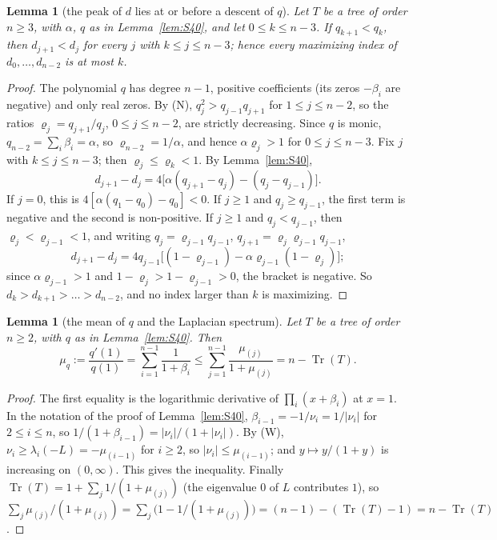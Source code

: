 \documentclass[11pt]{amsart}
\newtheorem{lemma}[theorem]{Lemma}
\theoremstyle{definition}
\theoremstyle{remark}
\newcommand{\Tr}{\operatorname{Tr}}
\begin{document}
\begin{lemma}[the peak of $d$ lies at or before a descent of $q$]\label{lem:S41}
Let $T$ be a tree of order $n\ge3$, with $\alpha$, $q$ as in
Lemma~\ref{lem:S40}, and let $0\le k\le n-3$. If $q_{k+1}<q_k$, then
$d_{j+1}<d_j$ for every $j$ with $k\le j\le n-3$; hence every maximizing
index of $d_0,\dots,d_{n-2}$ is at most $k$.
\end{lemma}

\begin{proof}
The polynomial $q$ has degree $n-1$, positive coefficients (its zeros
$-\beta_i$ are negative) and only real zeros. By (N),
$q_j^2>q_{j-1}q_{j+1}$ for $1\le j\le n-2$, so the ratios
$\varrho_j=q_{j+1}/q_j$, $0\le j\le n-2$, are strictly decreasing. Since $q$
is monic, $q_{n-2}=\sum_i\beta_i=\alpha$, so $\varrho_{n-2}=1/\alpha$, and
hence $\alpha\varrho_j>1$ for $0\le j\le n-3$. Fix $j$ with $k\le j\le n-3$;
then $\varrho_j\le\varrho_k<1$. By Lemma~\ref{lem:S40},
\[
d_{j+1}-d_j=4\bigl[\alpha(q_{j+1}-q_j)-(q_j-q_{j-1})\bigr].
\]
If $j=0$, this is $4[\alpha(q_1-q_0)-q_0]<0$. If $j\ge1$ and
$q_j\ge q_{j-1}$, the first term is negative and the second is non-positive.
If $j\ge1$ and $q_j<q_{j-1}$, then $\varrho_j<\varrho_{j-1}<1$, and writing
$q_j=\varrho_{j-1}q_{j-1}$, $q_{j+1}=\varrho_j\varrho_{j-1}q_{j-1}$,
\[
d_{j+1}-d_j=4q_{j-1}\bigl[(1-\varrho_{j-1})-\alpha\varrho_{j-1}(1-\varrho_j)\bigr];
\]
since $\alpha\varrho_{j-1}>1$ and $1-\varrho_j>1-\varrho_{j-1}>0$, the bracket
is negative. So $d_k>d_{k+1}>\dots>d_{n-2}$, and no index larger than $k$ is
maximizing.
\end{proof}

\begin{lemma}[the mean of $q$ and the Laplacian spectrum]\label{lem:S42}
Let $T$ be a tree of order $n\ge2$, with $q$ as in Lemma~\ref{lem:S40}. Then
\[
\mu_q:=\frac{q'(1)}{q(1)}=\sum_{i=1}^{n-1}\frac1{1+\beta_i}
\le\sum_{j=1}^{n-1}\frac{\mu_{(j)}}{1+\mu_{(j)}}=n-\Tr(T).
\]
\end{lemma}

\begin{proof}
The first equality is the logarithmic derivative of $\prod_i(x+\beta_i)$ at
$x=1$. In the notation of the proof of Lemma~\ref{lem:S40},
$\beta_{i-1}=-1/\nu_i=1/|\nu_i|$ for $2\le i\le n$, so
$1/(1+\beta_{i-1})=|\nu_i|/(1+|\nu_i|)$. By (W), $\nu_i\ge\lambda_i(-L)=-\mu_{(i-1)}$
for $i\ge2$, so $|\nu_i|\le\mu_{(i-1)}$; and $y\mapsto y/(1+y)$ is increasing
on $(0,\infty)$. This gives the inequality. Finally
$\Tr(T)=1+\sum_j1/(1+\mu_{(j)})$ (the eigenvalue $0$ of $L$ contributes $1$),
so $\sum_j\mu_{(j)}/(1+\mu_{(j)})=\sum_j\bigl(1-1/(1+\mu_{(j)})\bigr)=(n-1)-(\Tr(T)-1)=n-\Tr(T)$.
\end{proof}
\end{document}
